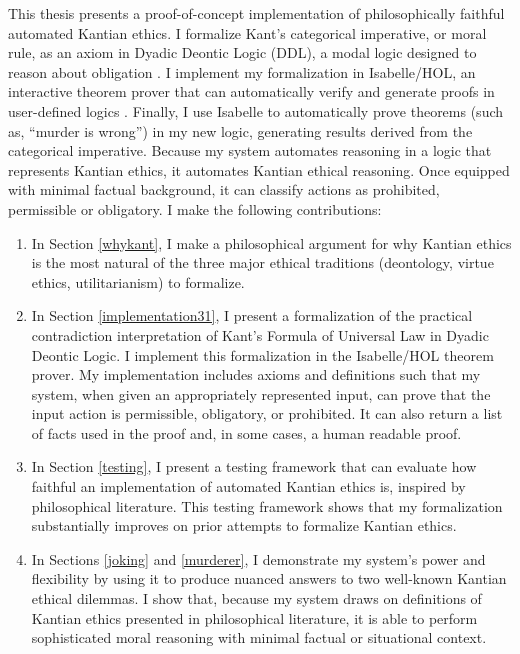 \begin{isabellebody}
\begin{isamarkuptext}
This thesis presents a proof-of-concept implementation of philosophically faithful automated Kantian ethics. 
I formalize Kant's categorical imperative, or moral rule, as an axiom 
in Dyadic Deontic Logic (DDL), a modal logic designed to reason about 
obligation \citep{CJDDL}. I implement my formalization in Isabelle/HOL, an interactive theorem prover 
that can automatically verify and generate proofs in user-defined logics \citep{isabelle}. Finally, 
I use Isabelle to automatically prove theorems (such as, ``murder is wrong'') in my new logic, 
generating results derived from the categorical imperative. Because my system automates reasoning in 
a logic that represents Kantian ethics, it automates Kantian ethical reasoning. Once equipped with 
minimal factual background, it can classify actions as prohibited, permissible or obligatory. I 
make the following contributions:%
\end{isamarkuptext}\isamarkuptrue%
%
\begin{isamarkuptext}%
\begin{enumerate}
\item In Section \ref{whykant}, I make a philosophical argument for why Kantian ethics is the most natural of the three major
ethical traditions (deontology, virtue ethics, utilitarianism) to formalize.

\item In Section \ref{implementation31}, I present a formalization of the practical contradiction interpretation of Kant's 
Formula of Universal Law in Dyadic Deontic Logic. I implement this formalization in the Isabelle/HOL
theorem prover. My implementation includes axioms and definitions such that my system, when given an appropriately
represented input, can prove that the input action is permissible, obligatory, or prohibited. It can also return
a list of facts used in the proof and, in some cases, a human readable proof. 

\item In Section \ref{testing}, I present a testing framework that can evaluate how faithful an implementation 
of automated Kantian ethics is, inspired by philosophical literature. This testing framework shows that 
my formalization substantially improves on prior attempts to formalize Kantian ethics. 

\item In Sections \ref{joking} and \ref{murderer}, I demonstrate my system's power and flexibility by 
using it to produce nuanced answers to two well-known Kantian ethical dilemmas. I show that, because 
my system draws on definitions of Kantian ethics presented in philosophical literature, it is able 
to perform sophisticated moral reasoning with minimal factual or situational context. 


\end{enumerate}
\end{isamarkuptext}
\end{isabellebody}

